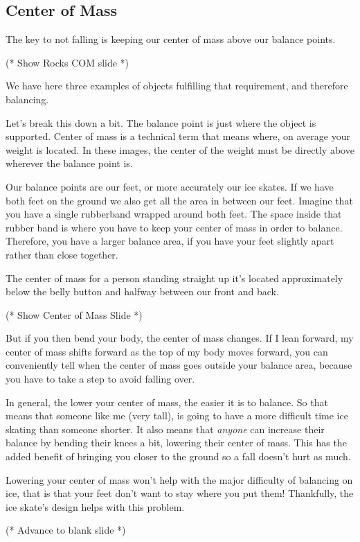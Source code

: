 \documentclass[12pt]{article}
\begin{document}
\subsection{Center of Mass}
The key to not falling is keeping 
our center of mass above our balance points. 

(* Show Rocks COM slide *)

We have here three examples of objects fulfilling that requirement, 
and therefore balancing. 

Let's break this down a bit. The balance point is just where the object is
supported. Center of mass is a technical term that means where, on average
your weight is located. In these images, the center of the weight must 
be directly above wherever the balance point is. 

Our balance points
are our feet, or more accurately our ice skates. If we have both
feet on the ground we also get all the area in between our feet.
Imagine that you have a single rubberband wrapped around both feet.
The space inside that rubber band is where you have to keep your
center of mass in order to balance. Therefore, you have a larger balance
area, if you have your feet slightly apart rather than close
together. 

The center of mass for a person standing
straight up it's located approximately  below the belly button and 
halfway between our front and back. 

(* Show Center of Mass Slide *)

But if you then bend your body, the center of mass changes. If I lean forward, 
my center of mass shifts forward as the top of my body moves forward,
you can conveniently tell when the center of mass goes outside your
balance area, because you have to take a step to avoid 
falling over. 

In general, the lower your center
of mass, the easier it is to balance. So that means that someone
like me (very tall), is going to have a more difficult time ice skating than
someone shorter. It also means that \emph{anyone} can increase their 
balance by bending their knees a bit, lowering their center of mass. 
This has the added benefit of bringing you closer to the ground so 
a fall doesn't hurt as much.

Lowering your center of mass won't help with the major 
difficulty 
of balancing on ice, that is that your feet don't want to stay 
where you put them! Thankfully, the ice skate's design helps 
with this problem. 

(* Advance to blank slide *)
\end{document}
